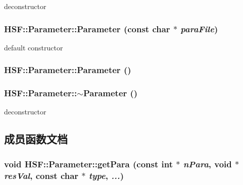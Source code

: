 deconstructor \hypertarget{classHSF_1_1Parameter_a99364861f624da340a461c0226bcca63}{
\subsubsection[{Parameter}]{\setlength{\rightskip}{0pt plus 5cm}HSF::Parameter::Parameter (const char $\ast$ {\em paraFile})}}
\label{classHSF_1_1Parameter_a99364861f624da340a461c0226bcca63}


default constructor \hypertarget{classHSF_1_1Parameter_a6c1b209f15999e6ddf19d756adbdbae8}{
\subsubsection[{Parameter}]{\setlength{\rightskip}{0pt plus 5cm}HSF::Parameter::Parameter ()}}
\label{classHSF_1_1Parameter_a6c1b209f15999e6ddf19d756adbdbae8}
\hypertarget{classHSF_1_1Parameter_ac59ca61eccd3d1e8ad38133c06ea8178}{
\subsubsection[{$\sim$Parameter}]{\setlength{\rightskip}{0pt plus 5cm}HSF::Parameter::$\sim$Parameter ()}}
\label{classHSF_1_1Parameter_ac59ca61eccd3d1e8ad38133c06ea8178}


deconstructor 

\subsection{成员函数文档}
\hypertarget{classHSF_1_1Parameter_a43cde4ecf939bca66b2dae7566eea056}{
\subsubsection[{getPara}]{\setlength{\rightskip}{0pt plus 5cm}void HSF::Parameter::getPara (const int $\ast$ {\em nPara}, \/  void $\ast$ {\em resVal}, \/  const char $\ast$ {\em type}, \/   {\em ...})}}
\label{classHSF_1_1Parameter_a43cde4ecf939bca66b2dae7566eea056}


